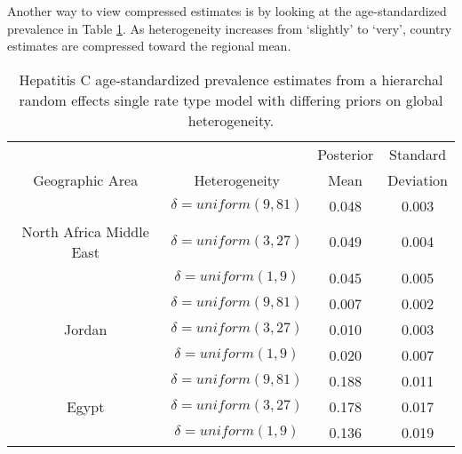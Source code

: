 Another way to view compressed estimates is by looking at the
age-standardized prevalence in Table \ref{tab:app-hepc global rfx}.
As heterogeneity increases from `slightly' to `very', country
estimates are compressed toward the regional mean.

    \begin{table}[h]
        \begin{center}
        \caption{ Hepatitis C age-standardized prevalence estimates from a hierarchal random effects single rate type model with differing priors on global heterogeneity.}
        \label{tab:app-hepc global rfx}
        \begin{tabular}{|c|c|c|c|}
            \hline
                & & Posterior & Standard \\
                Geographic Area & Heterogeneity & Mean & Deviation \\
            \hline
                & $\delta = uniform(9,81)$ & 0.048 & 0.003 \\
                North Africa Middle East & $\delta = uniform(3,27)$ & 0.049 & 0.004 \\
                & $\delta = uniform(1,9)$ & 0.045 & 0.005 \\
            \hline
                & $\delta = uniform(9,81)$ & 0.007 & 0.002 \\
                Jordan & $\delta = uniform(3,27)$ & 0.010 & 0.003 \\
                & $\delta = uniform(1,9)$ & 0.020 & 0.007 \\
            \hline
                & $\delta = uniform(9,81)$ & 0.188 & 0.011 \\
                Egypt & $\delta = uniform(3,27)$ & 0.178 & 0.017 \\
                & $\delta = uniform(1,9)$ & 0.136 & 0.019 \\
            \hline
        \end{tabular}
        \end{center}
    \end{table}
